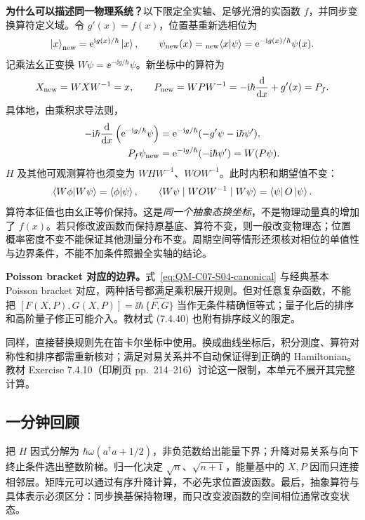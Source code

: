 \textbf{为什么可以描述同一物理系统？}以下限定全实轴、足够光滑的实函数 $f$，并同步变换算符定义域。令 $g'(x)=f(x)$，位置基重新选相位为
\begin{equation}
  \left|x\right\rangle_{\rm new}=\mathrm{e}^{\mathrm{i} g(x)/\hbar}\left|x\right\rangle,
  \qquad
  \psi_{\rm new}(x)={}_{\rm new}\!\left\langle x \middle| \psi \right\rangle
       =\mathrm{e}^{-\mathrm{i} g(x)/\hbar}\psi(x).
\end{equation}
记乘法幺正变换 $W\psi=\ee^{-\ii g/\hbar}\psi$。新坐标中的算符为
\begin{equation}
  X_{\rm new}=WXW^{-1}=x,\qquad
  P_{\rm new}=WPW^{-1}=-\mathrm{i}\hbar\frac{\mathop{}\!\mathrm{d}}{\mathop{}\!\mathrm{d} x}+g'(x)=P_f.
\end{equation}
具体地，由乘积求导法则，
\begin{align}
  -\mathrm{i}\hbar\frac{\mathop{}\!\mathrm{d}}{\mathop{}\!\mathrm{d} x}\left(\mathrm{e}^{-\mathrm{i} g/\hbar}\psi\right)
    &=\mathrm{e}^{-\mathrm{i} g/\hbar}(-g'\psi-\mathrm{i}\hbar\psi'),\\
  P_f\psi_{\rm new}&=\mathrm{e}^{-\mathrm{i} g/\hbar}(-\mathrm{i}\hbar\psi')=W(P\psi).
\end{align}
$H$ 及其他可观测算符也须变为 $WHW^{-1}$、$WOW^{-1}$。此时内积和期望值不变：
\begin{equation}
  \left\langle W\phi \middle| W\psi \right\rangle=\left\langle \phi \middle| \psi \right\rangle,\qquad
  \langle W\psi\mid WOW^{-1}\mid W\psi\rangle
     =\left\langle \psi\right| O\left|\psi\right\rangle.
\end{equation}
算符本征值也由幺正等价保持。这是\emph{同一个抽象态换坐标}，不是物理动量真的增加了 $f(x)$。若只修改波函数而保持原基底、算符不变，则一般改变物理态；位置概率密度不变不能保证其他测量分布不变。周期空间等情形还须核对相位的单值性与边界条件，不能不加条件照搬全实轴的结论。

\textbf{Poisson bracket 对应的边界。}式~\eqref{eq:QM-C07-S04-canonical} 与经典基本 Poisson bracket 对应，两种括号都满足乘积展开规则。但对任意复杂函数，不能把
$[F(X,P),G(X,P)]=\ii\hbar\,\widehat{\{F,G\}}$
当作无条件精确恒等式；量子化后的排序和高阶量子修正可能介入。教材式 (7.4.40) 也附有排序歧义的限定。

同样，直接替换规则先在笛卡尔坐标中使用。换成曲线坐标后，积分测度、算符对称性和排序都需重新核对；满足对易关系并不自动保证得到正确的 Hamiltonian。教材 Exercise 7.4.10（印刷页 pp.~214--216）讨论这一限制，本单元不展开其完整计算。

\subsection{一分钟回顾}
把 $H$ 因式分解为 $\hbar\omega(a^\dagger a+1/2)$，非负范数给出能量下界；升降对易关系与向下终止条件选出整数阶梯。归一化决定 $\sqrt n$、$\sqrt{n+1}$，能量基中的 $X,P$ 因而只连接相邻层。矩阵元可以通过有序升降计算，不必先求位置波函数。最后，抽象算符与具体表示必须区分：同步换基保持物理，而只改变波函数的空间相位通常改变状态。

